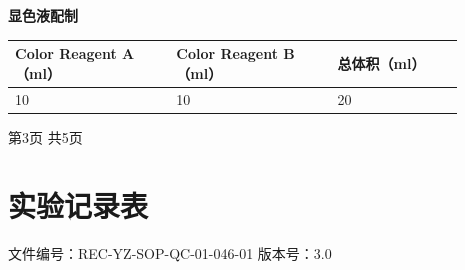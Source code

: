 \documentclass[UTF8,10pt,a4paper,fontset=fandol]{ctexart}
\newcommand{\fieldvalue}[1]{#1}
\newcommand{\handwritten}[1]{#1}
\begin{document}
\vspace{2mm}

\begin{center}
\textbf{显色液配制}

\begin{tabular}{|p{0.32\linewidth}|p{0.32\linewidth}|p{0.25\linewidth}|}
\hline
Color Reagent A（ml） & Color Reagent B（ml） & 总体积（ml）\\
\hline
\fieldvalue{\handwritten{10}} &
\fieldvalue{\handwritten{10}} &
\fieldvalue{\handwritten{20}}\\
\hline
\end{tabular}

\vspace{8mm}

第3页 共5页
\end{center}


\newpage

\section*{实验记录表}

\noindent
文件编号：REC-YZ-SOP-QC-01-046-01 \qquad 版本号：3.0
\end{document}
